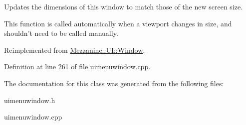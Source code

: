 Updates the dimensions of this window to match those of the new screen size. 

This function is called automatically when a viewport changes in size, and shouldn't need to be called manually. 

Reimplemented from \hyperlink{classMezzanine_1_1UI_1_1Window_a793c156e8de19f44b8c132b05ed4f7b6}{Mezzanine::UI::Window}.



Definition at line 261 of file uimenuwindow.cpp.



The documentation for this class was generated from the following files:\begin{DoxyCompactItemize}
\item 
uimenuwindow.h\item 
uimenuwindow.cpp\end{DoxyCompactItemize}
